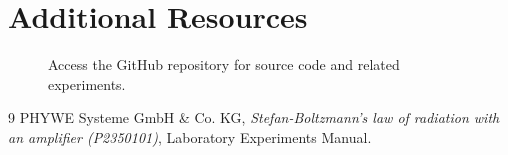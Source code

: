 \documentclass[journal]{IEEEtran}
\begin{document}
\section{Additional Resources}

\begin{figure}[H]
    \centering
    \begin{minipage}{0.15\textwidth}
        \centering
    \end{minipage}%
    \begin{minipage}{0.2\textwidth}
        \raggedright
        \caption{Access the GitHub repository for source code and related experiments.}
        \label{fig:qr_code}
    \end{minipage}
\end{figure}

\begin{thebibliography}{9}
    PHYWE Systeme GmbH \& Co. KG, \textit{Stefan-Boltzmann's law of radiation with an amplifier (P2350101)}, Laboratory Experiments Manual.
\end{thebibliography}
\end{document}
